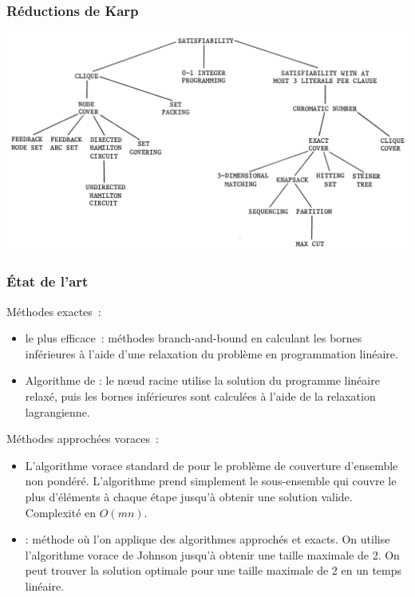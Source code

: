 \documentclass[aspectratio=169,11pt]{beamer}
\begin{document}
	\begin{frame}
		\frametitle{Réductions de Karp}
		\centering
		\includegraphics[width=\linewidth]{karp_reduction_tree}%
	\end{frame}


	\begin{frame}
		\frametitle{État de l'art}
		Méthodes exactes~:
		\begin{itemize}
			\item le plus efficace~: méthodes branch-and-bound en calculant les bornes inférieures à l'aide d'une relaxation du problème en programmation linéaire.~\cite{caprara2000algorithms}
			\item Algorithme de \citeauthor{Beasley1987}: le nœud racine utilise la solution du programme linéaire relaxé, puis les bornes inférieures sont calculées à l'aide de la relaxation lagrangienne.~\cite{Beasley1987}
		\end{itemize}
		Méthodes approchées voraces~:
		\begin{itemize}
			\item L'algorithme vorace standard de \citeauthor{Johnson:1973:AAC:800125.804034} pour le problème de couverture d'ensemble non pondéré. L'algorithme prend simplement le sous-ensemble qui couvre le plus d'éléments à chaque étape jusqu'à obtenir une solution valide. Complexité en \(O(mn)\).~\cite{Johnson:1973:AAC:800125.804034}
			\item \citeauthor{Goldschmidt:1993:MGH:177276.177287}: méthode où l'on applique des
				algorithmes approchés et exacts.
				On utilise l'algorithme vorace de Johnson jusqu'à obtenir une taille maximale de 2.
				On peut trouver la solution optimale pour une taille maximale de 2 en un temps linéaire.~\cite{Goldschmidt:1993:MGH:177276.177287}
		\end{itemize}
	\end{frame}
\end{document}
